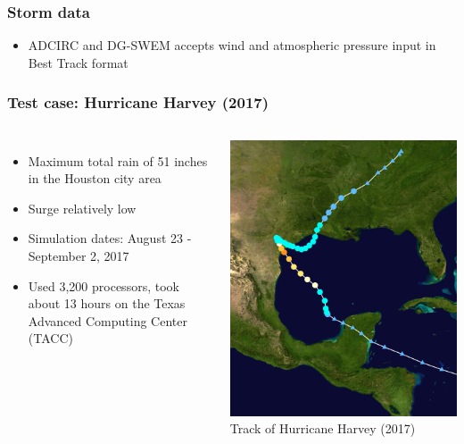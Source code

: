 \documentclass[10pt]{oden_beamer}
\begin{document}
\begin{frame}
  \frametitle{Storm data}
  \begin{itemize}
  \item ADCIRC and DG-SWEM accepts wind and atmospheric pressure input in Best Track format
  \end{itemize}
\end{frame}

\begin{frame}
  \frametitle{Test case: Hurricane Harvey (2017)}
  \begin{columns}
  \begin{itemize}
  \item Maximum total rain of 51 inches in the Houston city area
  \item Surge relatively low
  \item Simulation dates: August 23 - September 2, 2017
  \item Used 3,200 processors, took about 13 hours on the Texas Advanced Computing Center (TACC)
  \end{itemize}

  \centering
  \includegraphics[width=0.8\linewidth]{harvey_cropped.png} \\
  \footnotesize Track of Hurricane Harvey (2017)
  \end{columns}

\end{frame}
\end{document}
